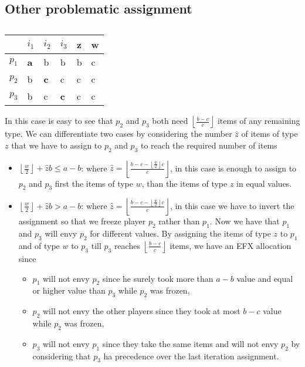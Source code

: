 \documentclass{article}
\newcommand{\floor}[3][2]{\left \lfloor\frac{#2}{#3}\right \rfloor}
\begin{document}
\subsection{Other problematic assignment}
\begin{table}[h]
\centering
\begin{tabular}{|l|l|l|l||l|l|}
\hline
      & $i_1$           & $i_2$      & $i_3$        & z & w \\ \hline
$p_1$ & \textbf{a}      & b          & b            & b & c \\ \hline
$p_2$ & b               & \textbf{c} & c            & c & c \\ \hline
$p_3$ & b               & c          & \textbf{c}   & c & c \\ \hline
\end{tabular}
\caption{}
\label{table-3-players-abb-bcc-bcc}
\end{table}
In this case is easy to see that $p_2$ and $p_3$ both need $\floor{b-c}{c}$ items of any remaining type. We can differentiate two cases by considering the number $\hat z$ of items of type $z$ that we have to assign to $p_2$ and $p_3$ to reach the required number of items
\begin{itemize}
    \item $\floor{w}{2} + \hat z b \le a-b$: where $\hat z = \floor{b-c-\floor{w}{2}c}{c}$, in this case is enough to assign to $p_2$ and $p_3$ first the items of type $w$, than the items of type $z$ in equal values.
    \item $\floor{w}{2} + \hat z b > a-b$: where $\hat z = \floor{b-c-\floor{w}{2}c}{c}$, in this case we have to invert the assignment so that we freeze player $p_2$ rather than $p_1$. Now we have that $p_1$ and $p_3$ will envy $p_2$ for different values. By assigning the items of type $z$ to $p_1$ and of type $w$ to $p_3$ till $p_3$ reaches $\floor{b-c}{c}$ items, we have an EFX allocation since 
    \begin{itemize}
        \item $p_1$ will not envy $p_2$ since he surely took more than $a-b$ value and equal or higher value than $p_3$ while $p_2$ was frozen,
        \item $p_2$ will not envy the other players since they took at most $b-c$ value while $p_2$ was frozen,
        \item $p_3$ will not envy $p_1$ since they take the same items and will not envy $p_2$ by considering that $p_3$ ha precedence over the last iteration assignment.
    \end{itemize}
\end{itemize}
\end{document}
